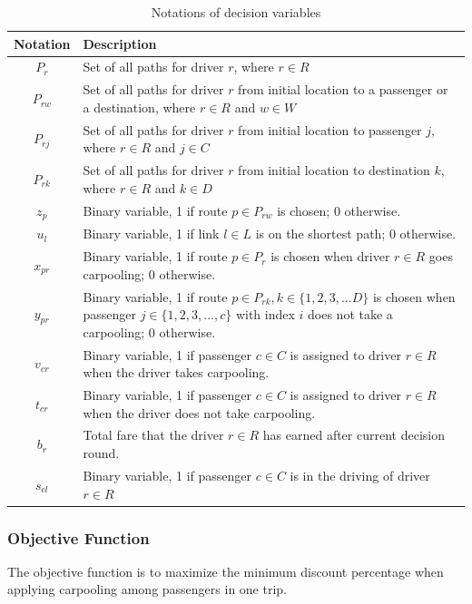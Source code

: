 \begin{table}[ht]
  \centering
  \caption{Notations of decision variables}
  \begin{tabularx}{\textwidth}{cX}
  \toprule
  Notation & Description \\
  \midrule
    $P_r$ & Set of all paths for driver $r$, where $r \in R$ \\
    $P_{rw}$ & Set of all paths for driver $r$ from initial location to a passenger or a destination, where $r \in R$ and $w \in W$ \\
    $P_{rj}$ & Set of all paths for driver $r$ from initial location to passenger $j$, where $r \in R$ and $j \in C$ \\
    $P_{rk}$ & Set of all paths for driver $r$ from initial location to destination $k$, where $r \in R$ and $k \in D$ \\
    $z_p$ & Binary variable, 1 if route $p \in P_{rw}$ is chosen; 0 otherwise. \\
    $u_l$ & Binary variable, 1 if link $l \in L$ is on the shortest path; 0 otherwise. \\
    $x_{pr}$ & Binary variable, 1 if route $p \in P_r$ is chosen when driver $r \in R$ goes carpooling; 0 otherwise. \\
    $y_{pr}$ & Binary variable, 1 if route $p \in P_{rk}, k \in \{1,2,3,...D\}$ is chosen when passenger $j \in \{1,2,3,...,c\}$ with index $i$ does not take a carpooling; 0 otherwise. \\
    $v_{cr}$ & Binary variable, 1 if passenger $c \in C$ is assigned to driver $r \in R$ when the driver takes carpooling. \\
    $t_{cr}$ & Binary variable, 1 if passenger $c \in C$ is assigned to driver $r \in R$ when the driver does not take carpooling. \\
    $b_r$ & Total fare that the driver $r \in R$ has earned after current decision round. \\
    $s_{cl}$ & Binary variable, 1 if passenger $c \in C$ is in the driving of driver $r \in R$ \\
  \bottomrule
  \end{tabularx}
\end{table}  
\newpage

\subsubsection*{Objective Function}

The objective function is to maximize the minimum discount percentage when applying carpooling among passengers in one trip.

